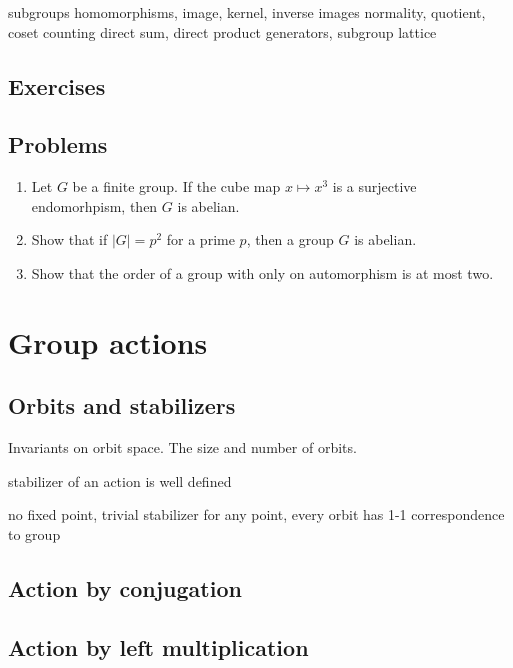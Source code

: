 \documentclass{../../large}
\begin{document}
subgroups
homomorphisms, image, kernel, inverse images
normality, quotient, coset counting
direct sum, direct product
generators, subgroup lattice



\section*{Exercises}

\section*{Problems}
\begin{enumerate}
\item Let $G$ be a finite group. If the cube map $x\mapsto x^3$ is a surjective endomorhpism, then $G$ is abelian.
\item Show that if $|G|=p^2$ for a prime $p$, then a group $G$ is abelian.
\item Show that the order of a group with only on automorphism is at most two.
\end{enumerate}









\chapter{Group actions}
\section{Orbits and stabilizers}
Invariants on orbit space.
The size and number of orbits.

\begin{prb}
stabilizer of an action is well defined

\end{prb}

\begin{prb}
no fixed point,
trivial stabilizer for any point,
every orbit has 1-1 correspondence to group
\end{prb}

\section{Action by conjugation}


\section{Action by left multiplication}
\end{document}
